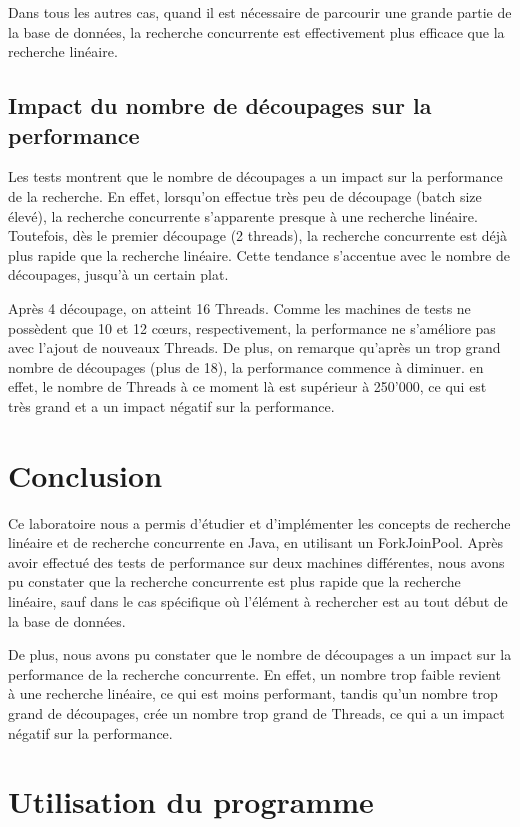 \documentclass[
  french,
  a4paper,
]{scrartcl}
\begin{document}
Dans tous les autres cas, quand il est nécessaire de parcourir une grande partie de la base de données,
la recherche concurrente est effectivement plus efficace que la recherche linéaire.

\subsection{Impact du nombre de découpages sur la performance}

Les tests montrent que le nombre de découpages a un impact sur la performance de la recherche. 
En effet, lorsqu'on effectue très peu de découpage (batch size élevé), la recherche concurrente
s'apparente presque à une recherche linéaire. Toutefois, dès le premier découpage (2 threads), 
la recherche concurrente est déjà plus rapide que la recherche linéaire. Cette tendance 
s'accentue avec le nombre de découpages, jusqu'à un certain plat. 

Après 4 découpage, on atteint 16 Threads. Comme les machines de tests ne possèdent que 
10 et 12 cœurs, respectivement, la performance ne s'améliore pas avec l'ajout de nouveaux Threads. 
De plus, on remarque qu'après un trop grand nombre de découpages (plus de 18), la 
performance commence à diminuer. en effet, le nombre de Threads à ce moment là est 
supérieur à 250'000, ce qui est très grand et a un impact négatif sur la performance.

\section{Conclusion}

Ce laboratoire nous a permis d'étudier et d'implémenter les concepts de recherche linéaire
et de recherche concurrente en Java, en utilisant un ForkJoinPool. 
Après avoir effectué des tests de performance sur deux machines différentes,
nous avons pu constater que la recherche concurrente est plus rapide que la recherche linéaire, 
sauf dans le cas spécifique où l'élément à rechercher est au tout début de la base de données. 

De plus, nous avons pu constater que le nombre de découpages a un impact sur la performance de la recherche
concurrente. En effet, un nombre trop faible revient à une recherche linéaire, ce qui est moins performant, 
tandis qu'un nombre trop grand de découpages, crée un nombre trop grand de Threads, ce qui a un impact négatif
sur la performance. 

\clearpage
\appendix
\section{Utilisation du programme}
\end{document}
